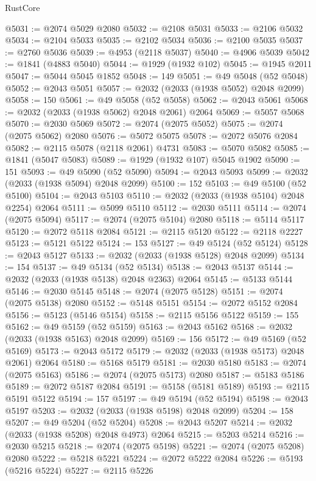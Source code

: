 \begin{lexlean}{RustCore}
\begin{coremodule}
@5031 := @2074 @5029 @2080
@5032 := @2108 @5031
@5033 := @2106 @5032
@5034 := @2104 @5033
@5035 := @2102 @5034
@5036 := @2100 @5035
@5037 := @2760 @5036
@5039 := @4953 (@2118 @5037)
@5040 := @4906 @5039
@5042 := @1841 (@4883 @5040)
@5044 := @1929 (@1932 @102)
@5045 := @1945 @2011
@5047 := @5044 @5045 @1852
@5048 := 149
@5051 := @49 @5048 (@52 @5048)
@5052 := @2043 @5051
@5057 := @2032 (@2033 (@1938 @5052) @2048 @2099)
@5058 := 150
@5061 := @49 @5058 (@52 @5058)
@5062 := @2043 @5061
@5068 := @2032 (@2033 (@1938 @5062) @2048 @2061) @2064
@5069 := @5057 @5068
@5070 := @2030 @5069
@5072 := @2074 (@2075 @5052)
@5075 := @2074 (@2075 @5062) @2080
@5076 := @5072 @5075
@5078 := @2072 @5076 @2084
@5082 := @2115 @5078 (@2118 @2061) @4731
@5083 := @5070 @5082
@5085 := @1841 (@5047 @5083)
@5089 := @1929 (@1932 @107) @5045 @1902
@5090 := 151
@5093 := @49 @5090 (@52 @5090)
@5094 := @2043 @5093
@5099 := @2032 (@2033 (@1938 @5094) @2048 @2099)
@5100 := 152
@5103 := @49 @5100 (@52 @5100)
@5104 := @2043 @5103
@5110 := @2032 (@2033 (@1938 @5104) @2048 @2254) @2064
@5111 := @5099 @5110
@5112 := @2030 @5111
@5114 := @2074 (@2075 @5094)
@5117 := @2074 (@2075 @5104) @2080
@5118 := @5114 @5117
@5120 := @2072 @5118 @2084
@5121 := @2115 @5120
@5122 := @2118 @2227
@5123 := @5121 @5122
@5124 := 153
@5127 := @49 @5124 (@52 @5124)
@5128 := @2043 @5127
@5133 := @2032 (@2033 (@1938 @5128) @2048 @2099)
@5134 := 154
@5137 := @49 @5134 (@52 @5134)
@5138 := @2043 @5137
@5144 := @2032 (@2033 (@1938 @5138) @2048 @2363) @2064
@5145 := @5133 @5144
@5146 := @2030 @5145
@5148 := @2074 (@2075 @5128)
@5151 := @2074 (@2075 @5138) @2080
@5152 := @5148 @5151
@5154 := @2072 @5152 @2084
@5156 := @5123 (@5146 @5154)
@5158 := @2115 @5156 @5122
@5159 := 155
@5162 := @49 @5159 (@52 @5159)
@5163 := @2043 @5162
@5168 := @2032 (@2033 (@1938 @5163) @2048 @2099)
@5169 := 156
@5172 := @49 @5169 (@52 @5169)
@5173 := @2043 @5172
@5179 := @2032 (@2033 (@1938 @5173) @2048 @2061) @2064
@5180 := @5168 @5179
@5181 := @2030 @5180
@5183 := @2074 (@2075 @5163)
@5186 := @2074 (@2075 @5173) @2080
@5187 := @5183 @5186
@5189 := @2072 @5187 @2084
@5191 := @5158 (@5181 @5189)
@5193 := @2115 @5191 @5122
@5194 := 157
@5197 := @49 @5194 (@52 @5194)
@5198 := @2043 @5197
@5203 := @2032 (@2033 (@1938 @5198) @2048 @2099)
@5204 := 158
@5207 := @49 @5204 (@52 @5204)
@5208 := @2043 @5207
@5214 := @2032 (@2033 (@1938 @5208) @2048 @4973) @2064
@5215 := @5203 @5214
@5216 := @2030 @5215
@5218 := @2074 (@2075 @5198)
@5221 := @2074 (@2075 @5208) @2080
@5222 := @5218 @5221
@5224 := @2072 @5222 @2084
@5226 := @5193 (@5216 @5224)
@5227 := @2115 @5226

\end{coremodule}
\end{lexlean}
